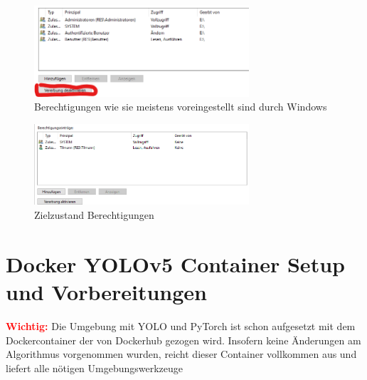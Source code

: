 \begin{figure}
    \centering
    \includegraphics[width=8cm]{data/img/berechtigungen_1.png}
    \caption{Berechtigungen wie sie meistens voreingestellt sind durch Windows}
    \label{fig:berecht_1}
\end{figure}
\begin{figure}
    \centering
    \includegraphics[width=8cm]{data/img/berechtigungen_2.png}
    \caption{Zielzustand Berechtigungen}
    \label{fig:berecht_2}
\end{figure}



\section{Docker YOLOv5 Container Setup und Vorbereitungen}

\textcolor{red}{\textbf{Wichtig:}} Die Umgebung mit YOLO und PyTorch ist schon aufgesetzt mit dem Dockercontainer der von Dockerhub gezogen wird. Insofern keine Änderungen am Algorithmus vorgenommen wurden, reicht dieser Container vollkommen aus und liefert alle nötigen Umgebungswerkzeuge


